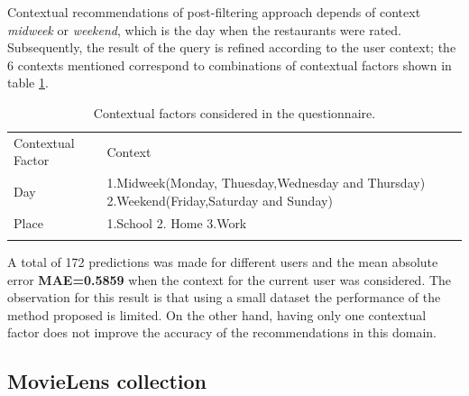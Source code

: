 Contextual recommendations of post-filtering approach depends of
context \textit{midweek} or \textit{weekend}, which is the day when
the restaurants were rated. Subsequently, the result of the query is
refined according to the user context; the 6 contexts mentioned
correspond to combinations of contextual factors shown in table
\ref{tab:contextstijuana}.
\begin{table}
\small
\captionsetup{font=footnotesize}
\caption{Contextual factors considered in the questionnaire.}
\label{tab:contextstijuana} 
\centering
\begin{tabular}{p{2.5cm} p{7cm} }
\hline\noalign{\smallskip}
Contextual Factor & Context \\
\noalign{\smallskip}\hline\noalign{\smallskip}
\small{Day} & \small{1.Midweek(Monday, Thuesday,Wednesday and Thursday)
2.Weekend(Friday,Saturday and Sunday)}  \\ \hline 
\small{Place} & \small{1.School 2. Home 3.Work} \\ 
\noalign{\smallskip}\hline
\end{tabular}
\end{table}
A total of 172 predictions was made for different users and the 
mean absolute error \textbf{MAE=0.5859} when the context 
for the current user was considered. 
The observation for this result is that using a small
dataset the performance of the method proposed is limited. On the other
hand, having only one contextual factor does not improve the accuracy
of the recommendations in this domain.
\subsection{MovieLens collection} 

